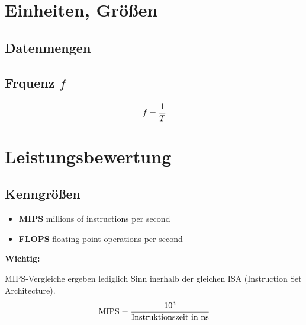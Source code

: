 \documentclass
[
	8pt,		%
	ngerman,	%
	a4paper,	%
	landscape,	%
	final		%
]{extarticle}
\newcommand*\important{\par\vspace{\abovedisplayskip}\textbf{Wichtig:}\par}
\begin{document}
\begin{multicols*}{4}
\section{Einheiten, Größen}
\subsection{Datenmengen}
\begin{center}
	
\end{center}
\subsection{Frquenz \(f\)}
\[f = \cfrac{1}{T}\]

\section{Leistungsbewertung}
\subsection{Kenngrößen}
\begin{itemize}
	\item \textbf{MIPS} millions of instructions per second
	\item \textbf{FLOPS} floating point operations per second
\end{itemize}
\important
MIPS-Vergleiche ergeben lediglich Sinn inerhalb der gleichen ISA
(Instruction Set Architecture).
\[\text{MIPS} = \cfrac{10^3}{\text{Instruktionszeit in ns}}\]

\end{multicols*}
\end{document}
